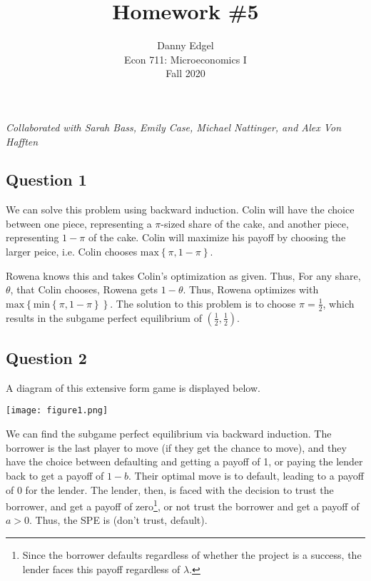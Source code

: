 \documentclass{article}
\begin{document}
\title{	Homework \#5 }
\author{ 	Danny Edgel 					\\ 
			Econ 711: Microeconomics I		\\
			Fall 2020						\\
		}
\maketitle\thispagestyle{empty}

\noindent\textit{Collaborated with Sarah Bass, Emily Case, Michael Nattinger, and Alex Von Hafften}


\subsection*{Question 1}
We can solve this problem using backward induction. Colin will have the choice between one piece, representing a $\pi$-sized share of the cake, and another piece, representing $1-\pi$ of the cake. Colin will maximize his payoff by choosing the larger peice, i.e. Colin chooses ${\text{max}\left\{\pi,1-\pi\right\}}$.

Rowena knows this and takes Colin's optimization as given. Thus, For any share, $\theta$, that Colin chooses, Rowena gets ${1-\theta}$. Thus, Rowena optimizes with ${\text{max}\left\{\text{min}\left\{\pi,1-\pi\right\}\right\}}$. The solution to this problem is to choose ${\pi=\frac{1}{2}}$, which results in the subgame perfect equilibrium of ${\left(\frac{1}{2},\frac{1}{2}\right)}$.



\subsection*{Question 2}
A diagram of this extensive form game is displayed below. 
\begin{center}
	\texttt{[image: figure1.png]}
\end{center}
We can find the subgame perfect equilibrium via backward induction. The borrower is the last player to move (if they get the chance to move), and they have the choice between defaulting and getting a payoff of 1, or paying the lender back to get a payoff of ${1-b}$. Their optimal move is to default, leading to a payoff of 0 for the lender. The lender, then, is faced with the decision to trust the borrower, and get a payoff of zero\footnote{Since the borrower defaults regardless of whether the project is a success, the lender faces this payoff regardless of $\lambda$.}, or not trust the borrower and get a payoff of $a>0$. Thus, the SPE is (don't trust, default).
\end{document}
